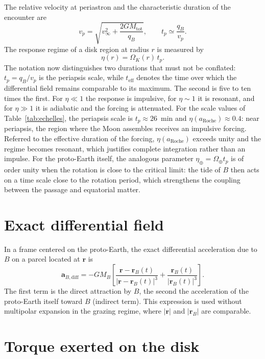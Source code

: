 \documentclass[11pt,a4paper,openany]{report}
\newcommand{\aR}{a_{\mathrm{Roche}}}
\newcommand{\Mtot}{M_{\mathrm{tot}}}
\begin{document}
The relative velocity at periastron and the characteristic duration of the encounter are
\begin{equation}
v_p=\sqrt{v_\infty^2+\frac{2G\Mtot}{q_B}},
\qquad
t_{p}\simeq\frac{q_B}{v_p}.
\label{eq:tenc}
\end{equation}
The response regime of a disk region at radius $r$ is measured by
\begin{equation}
\eta(r)=\Omega_K(r)\,t_{p}.
\label{eq:eta}
\end{equation}
The notation now distinguishes two durations that must not be conflated: $t_p=q_B/v_p$ is the
periapsis scale, while $t_{\mathrm{eff}}$ denotes the time over which the differential field remains
comparable to its maximum. The second is five to ten times the first.
For $\eta\ll1$ the response is impulsive, for $\eta\sim1$ it is resonant, and for $\eta\gg1$ it is
adiabatic and the forcing is attenuated. For the scale values of Table~\ref{tab:echelles}, the
periapsis scale is $t_{p}\approx26$~min and $\eta(\aR)\approx0.4$: near periapsis, the
region where the Moon assembles receives an impulsive forcing. Referred to the effective duration
of the forcing, $\eta(\aR)$ exceeds unity and the regime becomes resonant, which justifies complete
integration rather than an impulse. For the proto-Earth itself, the analogous parameter
$\eta_\oplus=\Omega_\oplus t_{p}$ is of order unity when the rotation is close to the
critical limit: the tide of $B$ then acts on a time scale close to the rotation period, which
strengthens the coupling between the passage and equatorial matter.

\section{Exact differential field}

In a frame centered on the proto-Earth, the exact differential acceleration due to $B$ on a parcel
located at $\mathbf{r}$ is
\begin{equation}
\mathbf{a}_{B,\mathrm{diff}}=-GM_B\left[
\frac{\mathbf{r}-\mathbf{r}_B(t)}{|\mathbf{r}-\mathbf{r}_B(t)|^3}
+\frac{\mathbf{r}_B(t)}{|\mathbf{r}_B(t)|^3}\right].
\label{eq:adiff}
\end{equation}
The first term is the direct attraction by $B$, the second the acceleration of the proto-Earth
itself toward $B$ (indirect term). This expression is used without multipolar expansion in the
grazing regime, where $|\mathbf{r}|$ and $|\mathbf{r}_B|$ are comparable.

\section{Torque exerted on the disk}
\end{document}
